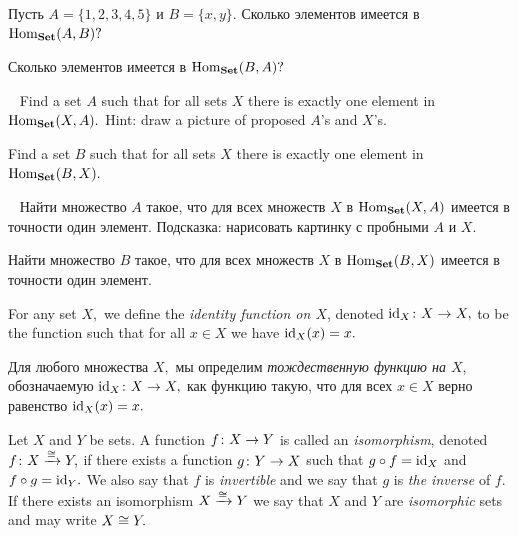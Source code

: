\documentclass[CT4S-EN-RU]{subfiles}
\begin{document}
\begin{exerciseRUS}
Пусть $A=\{1,2,3,4,5\}$ и $B=\{x,y\}.$ 
\sexc Сколько элементов имеется в $\textnormal{Hom}_{\mathbf{Set}}(A,B)?$ 
\item Сколько элементов имеется в $\textnormal{Hom}_{\mathbf{Set}}(B,A)?$
\endsexc
\end{exerciseRUS}

\begin{exerciseENG}~
\sexc Find a set $A$ such that for all sets $X$ there is exactly one element in $\textnormal{Hom}_{\mathbf{Set}}(X,A).$ Hint: draw a picture of proposed $A$'s and $X$'s.
\item Find a set $B$ such that for all sets $X$ there is exactly one element in $\textnormal{Hom}_{\mathbf{Set}}(B,X).$
\endsexc 
\end{exerciseENG}

\begin{exerciseRUS}~
\sexc Найти множество $A$ такое, что для всех множеств $X$ в $\textnormal{Hom}_{\mathbf{Set}}(X,A)$ имеется в точности один элемент. Подсказка: нарисовать картинку с пробными $A$ и $X.$
\item Найти множество $B$ такое, что для всех множеств $X$ в $\textnormal{Hom}_{\mathbf{Set}}(B,X)$ имеется в точности один элемент.
\endsexc 
\end{exerciseRUS}

\begin{blockENG}
For any set $X,$ we define the {\em identity function on $X$}, denoted $\textnormal{id}_X\colon X\rightarrow X,$ to be the function such that for all $x\in X$ we have $\textnormal{id}_X(x)=x.$
\end{blockENG}

\begin{blockRUS}
Для любого множества $X,$ мы определим {\em тождественную функцию на $X$}, обозначаемую $\textnormal{id}_X\colon X\rightarrow X,$ как функцию такую, что для всех $x\in X$ верно равенство $\textnormal{id}_X(x)=x.$
\end{blockRUS}

\begin{definitionENG}[Isomorphism]\label{def:iso in set} 
Let $X$ and $Y$ be sets. A function $f\colon X\rightarrow Y$ is called an {\em isomorphism}, denoted $f\colon X\xrightarrow{\cong}Y,$ if there exists a function $g\colon Y\rightarrow X$ such that $g\circ f=\textnormal{id}_X$ and $f\circ g=\textnormal{id}_Y.$ We also say that $f$ is {\em invertible} and we say that $g$ is {\em the inverse} of $f.$ If there exists an isomorphism $X\xrightarrow{\cong} Y$ we say that $X$ and $Y$ are {\em isomorphic} sets and may write $X\cong Y.$ 
\end{definitionENG}
\end{document}
